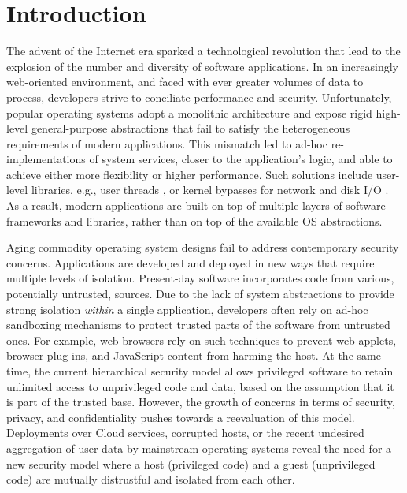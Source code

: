 \section{Introduction}

The advent of the Internet era sparked a technological revolution that lead to the explosion of the number and diversity of software applications.
In an increasingly web-oriented environment, and faced with ever greater volumes of data to process, developers strive to conciliate performance and security.
Unfortunately, popular operating systems adopt a monolithic architecture and expose rigid high-level general-purpose abstractions that fail to satisfy the heterogeneous requirements of modern applications.
This mismatch led to ad-hoc re-implementations of system services, closer to the application's logic, and able to achieve either more flexibility or higher performance.
Such solutions include user-level libraries, e.g., user threads \cite{golang}, or kernel bypasses for network and disk I/O \cite{DBLP:conf/nsdi/NanavatiWW17,intel2014data,intel2016storage,BelayPKGKB14}.
As a result, modern applications are built on top of multiple layers of software frameworks and libraries, rather than on top of the available OS abstractions.

Aging commodity operating system designs fail to address contemporary security concerns.
Applications are developed and deployed in new ways that require multiple levels of isolation.
Present-day software incorporates code from various, potentially untrusted, sources.
Due to the lack of system abstractions to provide strong isolation \emph{within} a single application, developers often rely on ad-hoc sandboxing mechanisms to protect trusted parts of the software from untrusted ones.
For example, web-browsers rely on such techniques to prevent web-applets, browser plug-ins, and JavaScript content from harming the host.
At the same time, the current hierarchical security model allows privileged software to retain unlimited access to unprivileged code and data, based on the assumption that it is part of the trusted base.
However, the growth of concerns in terms of security, privacy, and confidentiality pushes towards a reevaluation of this model.
Deployments over Cloud services, corrupted hosts, or the recent undesired aggregation of user data by mainstream operating systems \cite{microsoftspy} reveal the need for a new security model where a host (privileged code) and a guest (unprivileged code) are mutually distrustful and isolated from each other.

